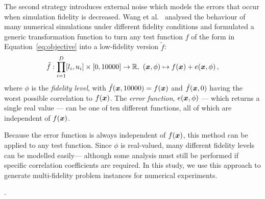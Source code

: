 The second strategy introduces external noise which models the errors that occur when simulation fidelity is decreased. Wang et al.~\cite{wang2017generic} analysed the behaviour of many numerical simulations under different fidelity conditions and 
formulated a generic transformation function to turn any test function $f$ of the form in Equation~\ref{eq:objective} into a low-fidelity version $\tilde f$:
\begin{equation}
\tilde f: \displaystyle\prod^D_{i=1}[l_i,u_i] \times [0,10000] \to \mathbb{R},\ (\V{x},\phi) \mapsto f(\V{x}) + e(\V{x},\phi)\,,\label{eq:error-fn}
\end{equation}
where $\phi$ is the \emph{fidelity level}, with $\tilde f(\boldsymbol{x},10000) = f(\boldsymbol{x})$ and $\tilde f(\boldsymbol{x},0)$ having the worst possible correlation to $f(\boldsymbol{x})$. The \emph{error function}, $e(\boldsymbol{x},\phi)$ --- which returns a single real value --- can be one of ten different functions, all of which are independent of $f(\boldsymbol{x})$.

Because the error function is always independent of $f(\boldsymbol{x})$, this method can be applied to any test function. Since $\phi$ is real-valued, many different fidelity levels can be modelled easily--- although some analysis must still be performed if specific correlation coefficients are required. In this study, we use this approach to generate multi-fidelity problem instances for numerical experiments. 

. 

